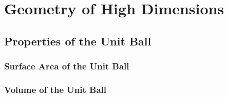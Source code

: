 \section{Geometry of High Dimensions}
\subsection{Properties of the Unit Ball}
\subsubsection{Surface Area of the Unit Ball}
\subsubsection{Volume of the Unit Ball}
